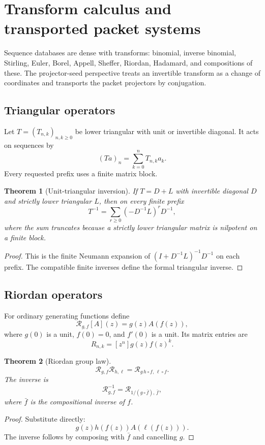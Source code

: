 \documentclass[11pt]{article}
\newtheorem{theorem}{Theorem}[section]\newtheorem{proposition}[theorem]{Proposition}\newtheorem{lemma}[theorem]{Lemma}\newtheorem{corollary}[theorem]{Corollary}
\theoremstyle{definition}\newtheorem{definition}[theorem]{Definition}\newtheorem{example}[theorem]{Example}\newtheorem{construction}[theorem]{Construction}\newtheorem{algorithm}[theorem]{Algorithm}\newtheorem{conjecture}[theorem]{Conjecture}\newtheorem{problem}[theorem]{Problem}
\theoremstyle{remark}\newtheorem{remark}[theorem]{Remark}\newtheorem{boundary}[theorem]{Boundary}\newtheorem{certificate}[theorem]{Computational Certificate}\newtheorem{classical}[theorem]{Classical Input}\newtheorem{principle}[theorem]{Structural Principle}
\begin{document}

\section{Transform calculus and transported packet systems}

Sequence databases are dense with transforms: binomial, inverse binomial, Stirling, Euler, Borel, Appell, Sheffer, Riordan, Hadamard, and compositions of these.  The projector-seed perspective treats an invertible transform as a change of coordinates and transports the packet projectors by conjugation.

\subsection{Triangular operators}
Let $T=(T_{n,k})_{n,k\geq0}$ be lower triangular with unit or invertible diagonal.  It acts on sequences by
\[
 (Ta)_n=\sum_{k=0}^{n}T_{n,k}a_k.
\]
Every requested prefix uses a finite matrix block.

\begin{theorem}[Unit-triangular inversion]
If $T=D+L$ with invertible diagonal $D$ and strictly lower triangular $L$, then on every finite prefix
\[
 \boxed{T^{-1}=\sum_{r\geq0}(-D^{-1}L)^rD^{-1},}
\]
where the sum truncates because a strictly lower triangular matrix is nilpotent on a finite block.
\end{theorem}
\begin{proof}
This is the finite Neumann expansion of $(I+D^{-1}L)^{-1}D^{-1}$ on each prefix.  The compatible finite inverses define the formal triangular inverse.
\end{proof}

\subsection{Riordan operators}
For ordinary generating functions define
\[
 \mathcal R_{g,f}[A](z)=g(z)A(f(z)),
\]
where $g(0)$ is a unit, $f(0)=0$, and $f'(0)$ is a unit.  Its matrix entries are
\[
 R_{n,k}=[z^n]g(z)f(z)^k.
\]

\begin{theorem}[Riordan group law]
\[
 \boxed{\mathcal R_{g,f}\mathcal R_{h,\ell}=\mathcal R_{g\,h\circ f,\,\ell\circ f}.}
\]
The inverse is
\[
 \boxed{\mathcal R_{g,f}^{-1}=\mathcal R_{1/(g\circ\bar f),\,\bar f},}
\]
where $\bar f$ is the compositional inverse of $f$.
\end{theorem}
\begin{proof}
Substitute directly:
\[
 g(z)h(f(z))A(\ell(f(z))).
\]
The inverse follows by composing with $\bar f$ and cancelling $g$.
\end{proof}
\end{document}
